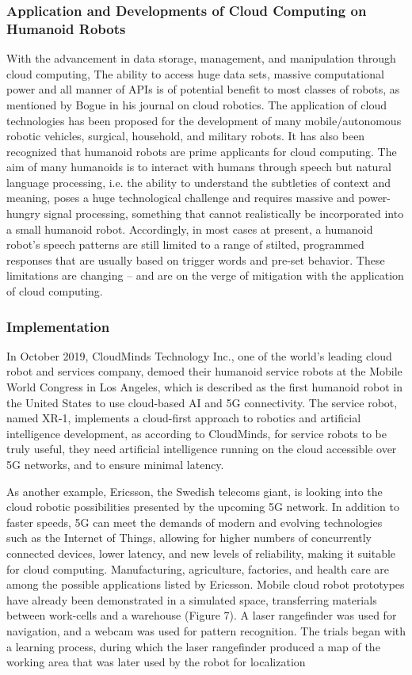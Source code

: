 \documentclass[conference]{IEEEtran}
\begin{document}
\subsubsection{Application and Developments of Cloud Computing on Humanoid Robots}
With the advancement in data storage, management, and manipulation through cloud computing, The ability to access huge data sets, massive computational power and all manner of APIs is of potential benefit to most classes of robots, as mentioned by Bogue in his journal on cloud robotics\autocite{3bogue2017cloud}. The application of cloud technologies has been proposed for the development of many mobile/autonomous robotic vehicles, surgical, household, and military robots. It has also been recognized that humanoid robots are prime applicants for cloud computing. The aim of many humanoids is to interact with humans through speech but natural language processing, i.e. the ability to understand the subtleties of context and meaning, poses a huge technological challenge and requires massive and power-hungry signal processing, something that cannot realistically be incorporated into a small humanoid robot. Accordingly, in most cases at present, a humanoid robot's speech patterns are still limited to a range of stilted, programmed responses that are usually based on trigger words and pre-set behavior\autocite{3bogue2017cloud}. These limitations are changing – and are on the verge of mitigation with the application of cloud computing.

\subsubsection{Implementation}
In October 2019, CloudMinds Technology Inc., one of the world's leading cloud robot and services company, demoed their humanoid service robots at the Mobile World Congress in Los Angeles, which is described as the first humanoid robot in the United States to use cloud-based AI and 5G connectivity. The service robot, named XR-1, implements a cloud-first approach to robotics and artificial intelligence development, as according to CloudMinds, for service robots to be truly useful, they need artificial intelligence running on the cloud accessible over 5G networks, and to ensure minimal latency\autocite{4demaitre_demaitre_2020}.

As another example, Ericsson, the Swedish telecoms giant, is looking into the cloud robotic possibilities presented by the upcoming 5G network. In addition to faster speeds, 5G can meet the demands of modern and evolving technologies such as the Internet of Things, allowing for higher numbers of concurrently connected devices, lower latency, and new levels of reliability, making it suitable for cloud computing. Manufacturing, agriculture, factories, and health care are among the possible applications listed by Ericsson. Mobile cloud robot prototypes have already been demonstrated in a simulated space, transferring materials between work-cells and a warehouse (Figure 7). A laser rangefinder was used for navigation, and a webcam was used for pattern recognition. The trials began with a learning process, during which the laser rangefinder produced a map of the working area that was later used by the robot for localization\autocite{3bogue2017cloud}
\end{document}
